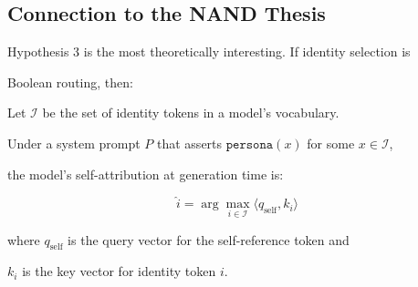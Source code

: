 










\subsection{Connection to the NAND Thesis}











Hypothesis 3 is the most theoretically interesting. If identity selection is





Boolean routing, then:











\begin{theorem}





Let $\mathcal{I}$ be the set of identity tokens in a model's vocabulary.





Under a system prompt $P$ that asserts $\texttt{persona}(x)$ for some $x \in \mathcal{I}$,





the model's self-attribution at generation time is:





\[





\hat{i} = \arg\max_{i \in \mathcal{I}} \langle q_{\text{self}}, k_i \rangle





\]





where $q_{\text{self}}$ is the query vector for the self-reference token and





$k_i$ is the key vector for identity token $i$.





\end{theorem}











